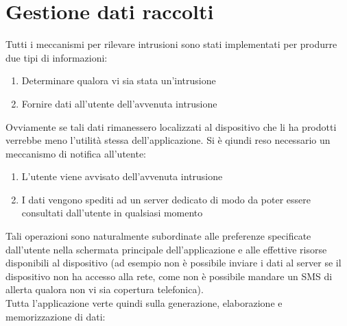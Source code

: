 \section {Gestione dati raccolti}
Tutti i meccanismi per rilevare intrusioni sono stati implementati per produrre due tipi di informazioni:
\begin{enumerate}
  \item Determinare qualora vi sia stata un'intrusione
  \item Fornire dati all'utente dell'avvenuta intrusione
\end{enumerate}
Ovviamente se tali dati rimanessero localizzati al dispositivo che li ha prodotti verrebbe meno l'utilità stessa dell'applicazione. Si è qiundi reso necessario un meccanismo di notifica all'utente:
\begin{enumerate}
  \item L'utente viene avvisato dell'avvenuta intrusione
  \item I dati vengono spediti ad un server dedicato di modo da poter essere consultati dall'utente in qualsiasi momento
\end{enumerate}
Tali operazioni sono naturalmente subordinate alle preferenze specificate dall'utente nella schermata principale dell'applicazione e alle effettive risorse disponibili al dispositivo (ad esempio non è possibile inviare i dati al server se il dispositivo non ha accesso alla rete, come non è possibile mandare un SMS di allerta qualora non vi sia copertura telefonica).\\
Tutta l'applicazione verte quindi sulla generazione, elaborazione e memorizzazione di dati:
